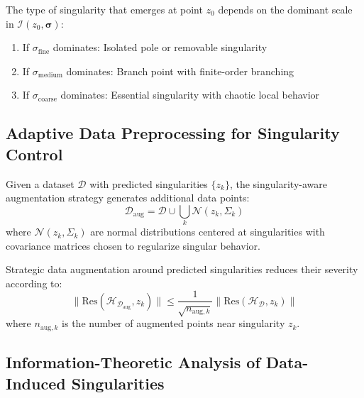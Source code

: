 \begin{theorem}
The type of singularity that emerges at point $z_0$ depends on the dominant scale in $\mathcal{I}(z_0, \boldsymbol{\sigma})$:
\begin{enumerate}
\item If $\sigma_{\text{fine}}$ dominates: Isolated pole or removable singularity
\item If $\sigma_{\text{medium}}$ dominates: Branch point with finite-order branching
\item If $\sigma_{\text{coarse}}$ dominates: Essential singularity with chaotic local behavior
\end{enumerate}
\end{theorem}

\subsection{Adaptive Data Preprocessing for Singularity Control}

\begin{definition}
Given a dataset $\mathcal{D}$ with predicted singularities $\{z_k\}$, the singularity-aware augmentation strategy generates additional data points:
\begin{equation}
\mathcal{D}_{\text{aug}} = \mathcal{D} \cup \bigcup_{k} \mathcal{N}(z_k, \Sigma_k)
\end{equation}
where $\mathcal{N}(z_k, \Sigma_k)$ are normal distributions centered at singularities with covariance matrices chosen to regularize singular behavior.
\end{definition}

\begin{theorem}
Strategic data augmentation around predicted singularities reduces their severity according to:
\begin{equation}
\|\text{Res}(\mathcal{H}_{\mathcal{D}_{\text{aug}}}, z_k)\| \leq \frac{1}{\sqrt{n_{\text{aug}, k}}} \|\text{Res}(\mathcal{H}_{\mathcal{D}}, z_k)\|
\end{equation}
where $n_{\text{aug}, k}$ is the number of augmented points near singularity $z_k$.
\end{theorem}

\subsection{Information-Theoretic Analysis of Data-Induced Singularities}

